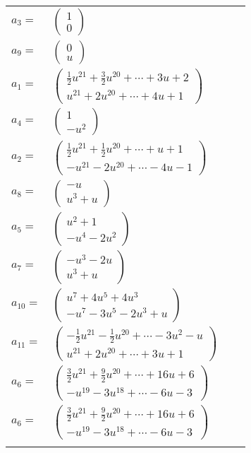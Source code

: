\documentclass[1p]{elsarticle_modified}
\theoremstyle{definition}
\begin{document}
\begin{tabular}{m{7pt} m{180pt} m{7pt} m{180pt} }
\flushright $a_{3}=$&$\begin{pmatrix}1\\0\end{pmatrix}$ \\
\flushright $a_{9}=$&$\begin{pmatrix}0\\u\end{pmatrix}$ \\
\flushright $a_{1}=$&$\begin{pmatrix}\frac{1}{2} u^{21}+\frac{3}{2} u^{20}+\cdots+3 u+2\\u^{21}+2 u^{20}+\cdots+4 u+1\end{pmatrix}$ \\
\flushright $a_{4}=$&$\begin{pmatrix}1\\- u^2\end{pmatrix}$ \\
\flushright $a_{2}=$&$\begin{pmatrix}\frac{1}{2} u^{21}+\frac{1}{2} u^{20}+\cdots+u+1\\- u^{21}-2 u^{20}+\cdots-4 u-1\end{pmatrix}$ \\
\flushright $a_{8}=$&$\begin{pmatrix}- u\\u^3+u\end{pmatrix}$ \\
\flushright $a_{5}=$&$\begin{pmatrix}u^2+1\\- u^4-2 u^2\end{pmatrix}$ \\
\flushright $a_{7}=$&$\begin{pmatrix}- u^3-2 u\\u^3+u\end{pmatrix}$ \\
\flushright $a_{10}=$&$\begin{pmatrix}u^7+4 u^5+4 u^3\\- u^7-3 u^5-2 u^3+u\end{pmatrix}$ \\
\flushright $a_{11}=$&$\begin{pmatrix}-\frac{1}{2} u^{21}-\frac{1}{2} u^{20}+\cdots-3 u^2- u\\u^{21}+2 u^{20}+\cdots+3 u+1\end{pmatrix}$ \\
\flushright $a_{6}=$&$\begin{pmatrix}\frac{3}{2} u^{21}+\frac{9}{2} u^{20}+\cdots+16 u+6\\- u^{19}-3 u^{18}+\cdots-6 u-3\end{pmatrix}$\\ \flushright $a_{6}=$&$\begin{pmatrix}\frac{3}{2} u^{21}+\frac{9}{2} u^{20}+\cdots+16 u+6\\- u^{19}-3 u^{18}+\cdots-6 u-3\end{pmatrix}$\\&\end{tabular}
\end{document}
